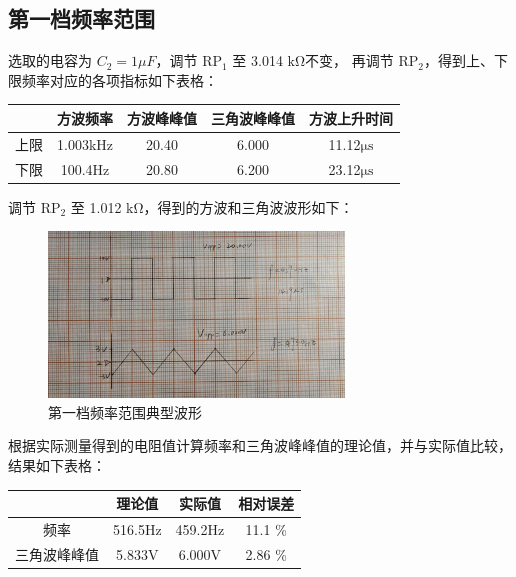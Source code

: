 \documentclass[a4paper,11pt,UTF8]{article}
\begin{document}
\subsection{第一档频率范围}

选取的电容为 $C_2 = 1\mu F$，调节 RP$_1$ 至 3.014 $\mathrm{k\Omega}$不变，
再调节 RP$_2$，得到上、下限频率对应的各项指标如下表格：

\begin{table}[H]
    \centering
    \begin{tabular}{|c|c|c|c|c|}
        \hline
         & 方波频率 & 方波峰峰值 & 三角波峰峰值 & 方波上升时间 \\
        \hline
        上限 & 1.003kHz & 20.40 & 6.000 & 11.12$\mathrm{\mu s}$ \\
        \hline
        下限 & 100.4Hz & 20.80 & 6.200 & 23.12$\mathrm{\mu s}$ \\
        \hline
    \end{tabular}
\end{table}

调节 RP$_2$ 至 1.012 $\mathrm{k\Omega}$，得到的方波和三角波波形如下：

\begin{figure}
    \centering
    \includegraphics[width=0.7\textwidth]{3.4.jpg}
    \caption{第一档频率范围典型波形}
\end{figure}

根据实际测量得到的电阻值计算频率和三角波峰峰值的理论值，并与实际值比较，结果如下表格：

\begin{table}[H]
    \centering
    \begin{tabular}{|c|c|c|c|}
        \hline
         & 理论值 & 实际值 & 相对误差 \\
        \hline
        频率 & 516.5Hz & 459.2Hz & 11.1 \% \\
        \hline
        三角波峰峰值 & 5.833$\mathrm{V}$ & 6.000$\mathrm{V}$ & 2.86 \%\\
        \hline
    \end{tabular}
\end{table}
\end{document}
